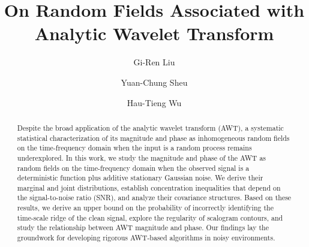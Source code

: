 \documentclass{amsart}
\begin{document}
\title[]{On Random Fields Associated with Analytic Wavelet Transform}
\author{Gi-Ren Liu}
\address{Department of Mathematics, National Cheng Kung University, Tainan, Taiwan}

\author{Yuan-Chung Sheu}
\address{Department of Applied Mathematics, National Yang Ming Chiao Tung University, Hsinchu, Taiwan}

\author{Hau-Tieng Wu}
\address{Courant Institute of Mathematical Sciences, New York University, New York, NY, 10012 USA}



\maketitle

\begin{abstract}
Despite the broad application of the analytic wavelet transform (AWT), a systematic statistical characterization of its magnitude and phase as inhomogeneous random fields on the time-frequency domain when the input is a random process remains underexplored.
In this work, we study the magnitude and phase of the AWT as random fields on the time-frequency domain when the observed signal is a deterministic function plus additive stationary Gaussian noise. We derive their marginal and joint distributions, establish concentration inequalities that depend on the signal-to-noise ratio (SNR), and analyze their covariance structures. Based on these results, we derive an upper bound on the probability of incorrectly identifying the time-scale ridge of the clean signal, explore the regularity of scalogram contours, and study the relationship between AWT magnitude and phase. Our findings lay the groundwork for developing rigorous AWT-based algorithms in noisy environments.
\end{abstract}
\end{document}
